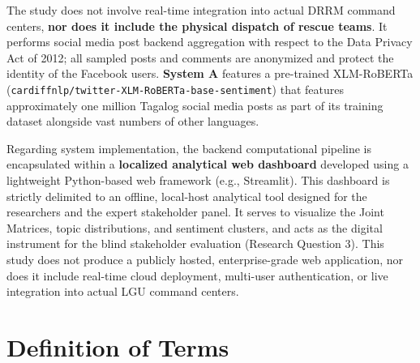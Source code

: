 \documentclass[12pt,a4paper]{report}
\newcommand{\sysA}{\textbf{System A}}
\newcommand{\xlmr}{XLM-RoBERTa}
\begin{document}
The study does not involve real-time integration into actual DRRM command
centers, \textbf{nor does it include the physical dispatch of rescue teams}. It performs
social media post backend aggregation with respect to the Data Privacy Act of
2012; all sampled posts and comments are anonymized and protect the identity
of the Facebook users. \sysA{} features a pre-trained \xlmr{}
(\texttt{cardiffnlp/twitter-XLM-RoBERTa-base-sentiment}) that features
approximately one million Tagalog social media posts as part of its training
dataset alongside vast numbers of other languages.

Regarding system implementation, the backend computational pipeline is 
encapsulated within a \textbf{localized analytical web dashboard} developed 
using a lightweight Python-based web framework (e.g., Streamlit). This 
dashboard is strictly delimited to an offline, local-host analytical tool 
designed for the researchers and the expert stakeholder panel. It serves 
to visualize the Joint Matrices, topic distributions, and sentiment clusters, 
and acts as the digital instrument for the blind stakeholder evaluation 
(Research Question 3). This study does not produce a publicly hosted, 
enterprise-grade web application, nor does it include real-time cloud 
deployment, multi-user authentication, or live integration into actual 
LGU command centers.

\section{Definition of Terms}
\end{document}
